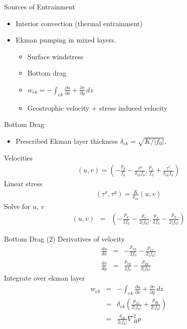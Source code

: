 \documentclass[a4paper]{beamer}
\begin{document}
\begin{frame}{Sources of Entrainment}
\begin{itemize}
\item Interior convection (thermal entrainment)
\item Ekman pumping in mixed layers.
\begin{itemize}
 \item Surface windstress
 \item Bottom drag
 \item $w_{ek} = -\int_{ek} \frac{\partial u}{\partial x} + \frac{\partial v}{\partial y}\,dz$
 \item Geostrophic velocity + stress induced velocity
\end{itemize}
\end{itemize}
\end{frame}

\begin{frame}{Bottom Drag}
\begin{itemize}
\item Prescribed Ekman layer thickness $\delta_{ek} = \sqrt{K/|f_0|}$.
\end{itemize}
Velocities
\begin{eqnarray}
(u, v) = \left(-\frac{p_y}{f_0} - \frac{\tau^y}{\delta_{ek}f_0}, \frac{p_x}{f_0} + \frac{\tau^x}{\delta_{ek}f_0}\right)
\end{eqnarray}
Linear stress
\begin{eqnarray}
(\tau^x, \tau^y) = \frac{K}{\delta_{ek}}\left(u, v\right)
\end{eqnarray}
Solve for $u$, $v$
\begin{eqnarray}
(u, v) & = & \left(-\frac{p_y}{2f_0} - \frac{p_x}{2|f_0|}, \frac{p_x}{2f_0} - \frac{p_y}{2|f_0|}\right)
\end{eqnarray}
\end{frame}

\begin{frame}{Bottom Drag (2)}
Derivatives of velocity
\begin{eqnarray}
\frac{du}{dx} & = & -\frac{p_{xy}}{2f_0} - \frac{p_{xx}}{2|f_0|}\\
\frac{dv}{dy} & = &  \frac{p_{xy}}{2f_0} - \frac{p_{yy}}{2|f_0|}
\end{eqnarray}
Integrate over ekman layer
\begin{eqnarray}
w_{ek} & = & -\int_{ek} \frac{\partial u}{\partial x} + \frac{\partial v}{\partial y}\,dz\\
       & = & \delta_{ek}\left(\frac{p_{xx}}{2|f_0|} + \frac{p_{yy}}{2|f_0|}\right)\\
       & = & \frac{\delta_{ek}}{2|f_0|}\nabla^2_Hp
\end{eqnarray}
\end{frame}
\end{document}
